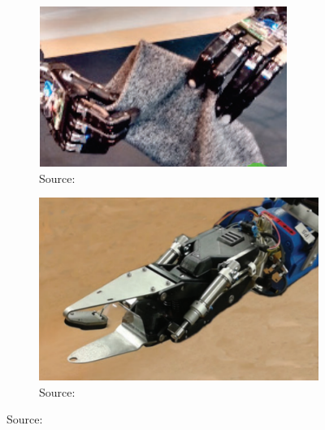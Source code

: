 \documentclass[\home/main.tex]{subfiles}
\begin{document}
\begin{figure}[htpb]{}
    \centering
    \begin{subfigure}[b]{0.49\textwidth}
        \includegraphics[width=\linewidth,keepaspectratio]{figures/grippers_general_purpose}
        \caption{Source: \autocite{Twardon2015}}
        \label{fig:towards_grippers_gp}
    \end{subfigure}
    \hfill
    \begin{subfigure}[b]{0.49\textwidth}
        \includegraphics[width=\linewidth,keepaspectratio]{figures/grippers_clopema}
        \caption{Source: \autocite{Doumanoglou2016}}
        \label{fig:towards_grippers_specific}
    \end{subfigure}

    \par\bigskip 


\end{figure}
\end{document}
